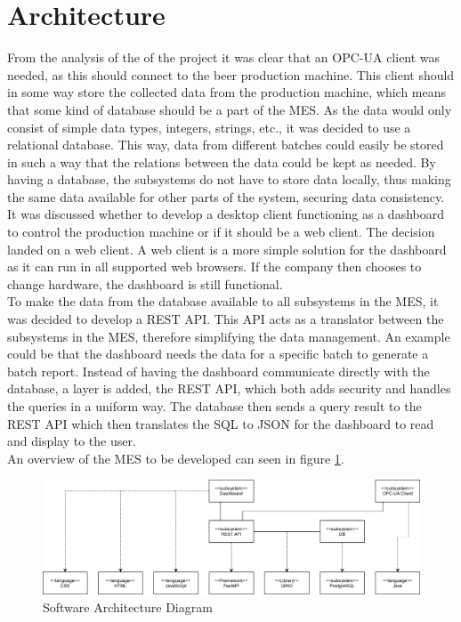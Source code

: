 \section{Architecture}
From the analysis of the of the project it was clear that an OPC-UA
client was needed, as this should connect to the beer production machine. This
client should in some way store the collected data from the production machine,
which means that some kind of database should be a part of the MES. As the data
would only consist of simple data types, integers, strings, etc., it was decided
to use a relational database. This way, data from different batches could easily
be stored in such a way that the relations between the data could be kept as
needed. By having a database, the subsystems do not have to store data
locally, thus making the same data available for other parts of the system,
securing data consistency. \\

It was discussed whether to develop a desktop client functioning as a dashboard
to control the production machine or if it should be a web client. The decision
landed on a web client. A web client is a more simple solution for the dashboard
as it can run in all supported web browsers. If the company then chooses to
change hardware, the dashboard is still functional. \\
 
To make the data from the database available to all subsystems in the MES, 
it was decided to develop a REST API. This API acts as a translator
between the subsystems in the MES, therefore simplifying the data management.
An example could be that the dashboard needs the data for a specific batch to
generate a batch report. Instead of having the dashboard communicate directly
with the database, a layer is added, the REST API, which both adds security and
handles the queries in a uniform way. The database then sends a query result to
the REST API which then translates the SQL to JSON for the dashboard to read
and display to the user. \\

An overview of the MES to be developed can seen in figure
\ref{figure:architucture_diagram}.

\begin{figure}[ht]
	\centering 
	\includegraphics[scale=0.24]{images/diagrams/architecture_diagram.png}
	\caption{Software Architecture Diagram}
	\label{figure:architucture_diagram} 
\end{figure}
